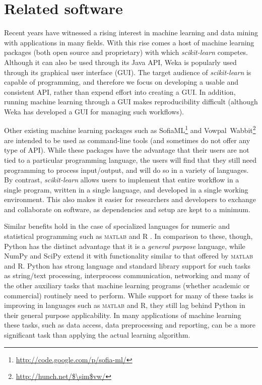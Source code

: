 \documentclass{llncs}
\newcommand{\sklearn}{\textit{scikit-learn}\xspace}
\begin{document}
\section{Related software}
\label{sec:comparison}

Recent years have witnessed a rising interest in machine learning and data mining
with applications in many fields.
With this rise comes a host of machine learning packages
(both open source and proprietary) with which \sklearn competes.
Although it can also be used through its Java API, Weka \citep{hall2009weka} is
popularly used through its graphical user interface (GUI). The target audience
of \sklearn is capable of programming, and therefore we focus on developing
a usable and consistent API, rather than expend effort into creating a GUI\@. In
addition, running machine learning through a GUI makes reproducibility difficult
(although Weka has developed a GUI for managing such workflows).

Other existing machine learning packages
such as SofiaML\footnote{\url{http://code.google.com/p/sofia-ml/}}
and Vowpal~Wabbit\footnote{\url{http://hunch.net/$\sim$vw/}}
are intended to be used as command-line tools
(and sometimes do not offer any type of API).
While these packages have the advantage
that their users are not tied to a particular programming language,
the users will find that they still need programming to process input/output,
and will do so in a variety of languages.
By contrast, \sklearn allows users to implement that entire workflow
in a single program, written in a single language,
and developed in a single working environment.
This also makes it easier for researchers and developers
to exchange and collaborate on software, as dependencies and setup are kept to a
minimum.

Similar benefits hold in the case of specialized languages
for numeric and statistical programming
such as \textsc{matlab} and R \citep{r}.
In comparison to these, though, Python has the distinct advantage
that it is a \textit{general purpose} language,
while NumPy and SciPy extend it with functionality
similar to that offered by \textsc{matlab} and R.
Python has strong language and standard library support for such tasks as
string/text processing, interprocess communication, networking
and many of the other auxiliary tasks that machine learning programs
(whether academic or commercial) routinely need to perform.
While support for many of these tasks is improving in languages such as
\textsc{matlab} and R, they still lag behind Python in their general purpose
applicability.
In many applications of machine learning these tasks, such as data access,
data preprocessing and reporting, can be a more significant task than applying
the actual learning algorithm.
\end{document}
